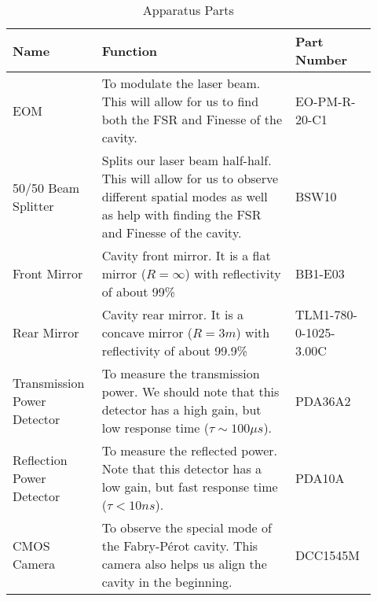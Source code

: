 \begin{table}[htbp]
\centering
\caption{Apparatus Parts} 
\label{tab:parts}
\begin{tabular}{|p{0.22\linewidth}|p{0.5\linewidth}|p{0.2\linewidth}|}
 \hline
 \textbf{Name}
 &
 \textbf{Function}
 &
 \textbf{Part Number}
 \\
 \hline
 EOM
 &
 To modulate the laser beam. This will allow for us to find both the FSR and Finesse of the cavity.
 &
 EO-PM-R-20-C1
 \\
 \hline
 50/50 Beam Splitter
 &
 Splits our laser beam half-half. This will allow for us to observe different spatial modes as well as help with finding the FSR and Finesse of the cavity.
 &
 BSW10
 \\
 \hline
 Front Mirror
 &
 Cavity front mirror. It is a flat mirror ($R=\infty$) with reflectivity of about 99\%
 &
 BB1-E03
 \\
 \hline 
 Rear Mirror 
 &
 Cavity rear mirror. It is a concave mirror ($R = 3 \si{m}$) with reflectivity of about 99.9\%
 &
 TLM1-780-0-1025-3.00C
 \\
 \hline 
 Transmission Power Detector
 &
 To measure the transmission power. We should note that this detector has a high gain, but low response time ($\tau \sim 100 \si{\mu s}$).
 &
 PDA36A2
 \\
 \hline 
 Reflection Power Detector
 &
 To measure the reflected power. Note that this detector has a low gain, but fast response time ($\tau< 10 \si{n s}$).
 &
 PDA10A
 \\
 \hline 
 CMOS Camera 
 &
 To observe the special mode of the Fabry-P\'{e}rot cavity. This camera also helps us align the cavity in the beginning.
 &
 DCC1545M
 \\
 \hline
\end{tabular}
\end{table}